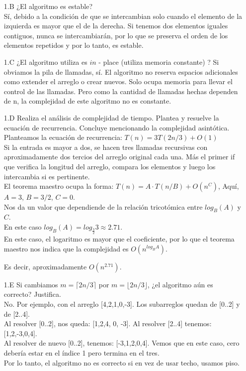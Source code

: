 \documentclass[12pt]{article}
\begin{document}
\begin{itemize}
    \item[1.B] ¿El algoritmo es estable?\\
    Sí, debido a la condición de que se intercambian solo cuando el elemento de la izquierda es mayor que el de la derecha.
    Si tenemos dos elementos iguales contiguos, nunca se intercambiarán, por lo que se preserva el orden de los elementos repetidos y por lo tanto, es estable.
    \item[1.C] ¿El algoritmo utiliza es $in$ - place (utiliza memoria constante) ?
    Si obviamos la pila de llamadas, sí. El algoritmo no reserva espacios adicionales como extender el arreglo o crear nuevos. Solo ocupa memoria para llevar el control de las llamadas. Pero como la cantidad de llamadas hechas dependen de n, la complejidad de este algoritmo no es constante.
    \item[1.D] Realiza el análisis de complejidad de tiempo. Plantea y resuelve la ecuación de recurrencia. Concluye mencionando la complejidad asintótica.\\
    Planteamos la ecuación de recurrencia: $T(n) = 3T(2n/3) + O(1)$\\ Si la entrada es mayor a dos, se hacen tres llamadas recursivas con aproximadamente dos tercios del arreglo original cada una. Más el primer if que verifica la longitud del arreglo, compara los elementos y luego los intercambia si es pertinente.\\
    El teorema maestro ocupa la forma: $T(n) = A \cdot T(n/B) + O(n^C)$, Aquí, $A = 3$, $B = 3 / 2$, $C = 0$.\\
    Nos da un valor que dependiende de la relación tricotómica entre $log_B(A)$ y $C$.\\
    En este caso $log_B(A) = log_\frac{3}{2}3 \approx 2.71$.\\
    En este caso, el logaritmo es mayor que el coeficiente, por lo que el teorema maestro nos indica que la complejidad es $O(n^{log_BA})$.

    Es decir, aproximadamente $O(n^{2.71})$.
    \item[1.E] Si cambiamos $m = \lceil 2n/3 \rceil$ por $m = \lfloor 2n/3 \rfloor$, ¿el algoritmo aún es correcto? Justifica.\\
    No. Por ejemplo, con el arreglo [4,2,1,0,-3]. Los subarreglos quedan de [0..2] y de [2..4].\\
    Al resolver [0..2], nos queda: [1,2,4, 0, -3]. Al resolver [2..4] tenemos: [1,2,-3,0,4].\\
    Al resolver de nuevo [0..2], tenemos: [-3,1,2,0,4]. Vemos que en este caso, cero debería estar en el índice 1 pero termina en el tres.\\
    Por lo tanto, el algoritmo no es correcto si en vez de usar techo, usamos piso.
\end{itemize}
\end{document}
